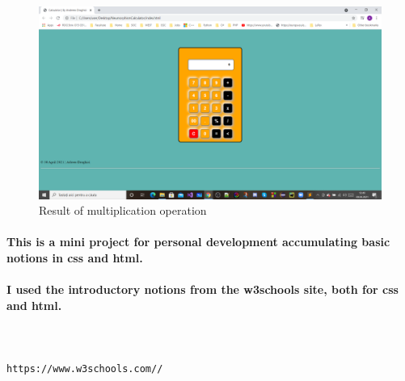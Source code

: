 \documentclass{article}
\begin{document}
\vspace{1.5cm}
\begin{figure}[h]
    \centering
    \includegraphics[width=15cm]{rezultat.png}
    \caption{Result of multiplication operation}
    \label{inmultire.png}
\end{figure}
\newpage
\paragraph{This is a mini project for personal development accumulating basic notions in css and html.\\\\
I used the introductory notions from the w3schools site, both for css and html.\\\\}
\begin{thebibliography}{}
\\\texttt{https://www.w3schools.com/\css/\\}
\end{thebibliography}
\end{document}
